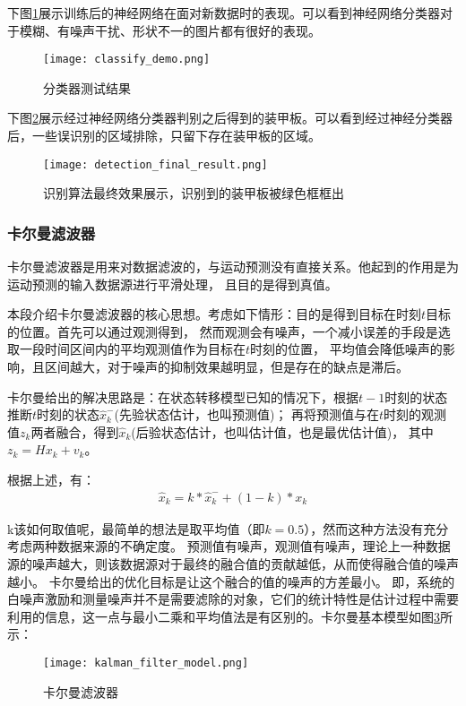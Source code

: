 下图\ref{分类器测试结果}展示训练后的神经网络在面对新数据时的表现。可以看到神经网络分类器对于模糊、有噪声干扰、形状不一的图片都有很好的表现。
\begin{figure}[H]
    \centering
    \texttt{[image: classify\_demo.png]} 
    \caption{分类器测试结果} 
    \label{分类器测试结果}
\end{figure}

下图\ref{识别算法最终效果展示}展示经过神经网络分类器判别之后得到的装甲板。可以看到经过神经分类器后，一些误识别的区域排除，只留下存在装甲板的区域。
\begin{figure}[H]
    \centering
    \texttt{[image: detection\_final\_result.png]} 
    \caption{识别算法最终效果展示，识别到的装甲板被绿色框框出} 
    \label{识别算法最终效果展示}
\end{figure}

\subsubsection{卡尔曼滤波器}
卡尔曼滤波器\cite{welch1995introduction}是用来对数据滤波的，与运动预测没有直接关系。他起到的作用是为运动预测的输入数据源进行平滑处理，
且目的是得到真值。\par

本段介绍卡尔曼滤波器的核心思想。考虑如下情形：目的是得到目标在时刻$t$目标的位置。首先可以通过观测得到，
然而观测会有噪声，一个减小误差的手段是选取一段时间区间内的平均观测值作为目标在$t$时刻的位置，
平均值会降低噪声的影响，且区间越大，对于噪声的抑制效果越明显，但是存在的缺点是滞后。\par

卡尔曼给出的解决思路是：在状态转移模型已知的情况下，根据$t-1$时刻的状态推断$t$时刻的状态$\hat{x}_k^{-}$(先验状态估计，也叫预测值)；
再将预测值与在$t$时刻的观测值$z_k$两者融合，得到$\hat{x}_k$(后验状态估计，也叫估计值，也是最优估计值)，
其中$z_k=Hx_k+v_k$。\par

根据上述，有：
\begin{gather}
    \hat{x}_k = k*\hat{x}_k^{-} + (1-k)*x_k
\end{gather}

k该如何取值呢，最简单的想法是取平均值（即$k=0.5$），然而这种方法没有充分考虑两种数据来源的不确定度。
预测值有噪声，观测值有噪声，理论上一种数据源的噪声越大，则该数据源对于最终的融合值的贡献越低，从而使得融合值的噪声越小。
卡尔曼给出的优化目标是让这个融合的值的噪声的方差最小。
即，系统的白噪声激励和测量噪声并不是需要滤除的对象，它们的统计特性是估计过程中需要利用的信息，这一点与最小二乘和平均值法是有区别的。卡尔曼基本模型如图\ref{卡尔曼滤波器}所示：
\begin{figure}[H]
    \centering
    \texttt{[image: kalman\_filter\_model.png]} 
    \caption{卡尔曼滤波器} 
    \label{卡尔曼滤波器} 
\end{figure} 

